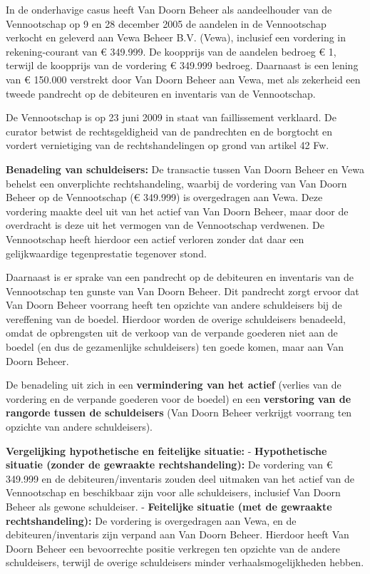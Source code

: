 \documentclass[
  dutch,
  a4paper,
]{article}
\begin{document}
In de onderhavige casus heeft Van Doorn Beheer als aandeelhouder van de Vennootschap op 9 en 28 december 2005 de aandelen in de Vennootschap verkocht en geleverd aan Vewa Beheer B.V. (Vewa), inclusief een vordering in rekening-courant van € 349.999. De koopprijs van de aandelen bedroeg € 1, terwijl de koopprijs van de vordering € 349.999 bedroeg. Daarnaast is een lening van € 150.000 verstrekt door Van Doorn Beheer aan Vewa, met als zekerheid een tweede pandrecht op de debiteuren en inventaris van de Vennootschap.

De Vennootschap is op 23 juni 2009 in staat van faillissement verklaard. De curator betwist de rechtsgeldigheid van de pandrechten en de borgtocht en vordert vernietiging van de rechtshandelingen op grond van artikel 42 Fw.

\textbf{Benadeling van schuldeisers:}
De transactie tussen Van Doorn Beheer en Vewa behelst een onverplichte rechtshandeling, waarbij de vordering van Van Doorn Beheer op de Vennootschap (€ 349.999) is overgedragen aan Vewa. Deze vordering maakte deel uit van het actief van Van Doorn Beheer, maar door de overdracht is deze uit het vermogen van de Vennootschap verdwenen. De Vennootschap heeft hierdoor een actief verloren zonder dat daar een gelijkwaardige tegenprestatie tegenover stond.

Daarnaast is er sprake van een pandrecht op de debiteuren en inventaris van de Vennootschap ten gunste van Van Doorn Beheer. Dit pandrecht zorgt ervoor dat Van Doorn Beheer voorrang heeft ten opzichte van andere schuldeisers bij de vereffening van de boedel. Hierdoor worden de overige schuldeisers benadeeld, omdat de opbrengsten uit de verkoop van de verpande goederen niet aan de boedel (en dus de gezamenlijke schuldeisers) ten goede komen, maar aan Van Doorn Beheer.

De benadeling uit zich in een \textbf{vermindering van het actief} (verlies van de vordering en de verpande goederen voor de boedel) en een \textbf{verstoring van de rangorde tussen de schuldeisers} (Van Doorn Beheer verkrijgt voorrang ten opzichte van andere schuldeisers).

\textbf{Vergelijking hypothetische en feitelijke situatie:}
- \textbf{Hypothetische situatie (zonder de gewraakte rechtshandeling):} De vordering van € 349.999 en de debiteuren/inventaris zouden deel uitmaken van het actief van de Vennootschap en beschikbaar zijn voor alle schuldeisers, inclusief Van Doorn Beheer als gewone schuldeiser.
- \textbf{Feitelijke situatie (met de gewraakte rechtshandeling):} De vordering is overgedragen aan Vewa, en de debiteuren/inventaris zijn verpand aan Van Doorn Beheer. Hierdoor heeft Van Doorn Beheer een bevoorrechte positie verkregen ten opzichte van de andere schuldeisers, terwijl de overige schuldeisers minder verhaalsmogelijkheden hebben.
\end{document}
